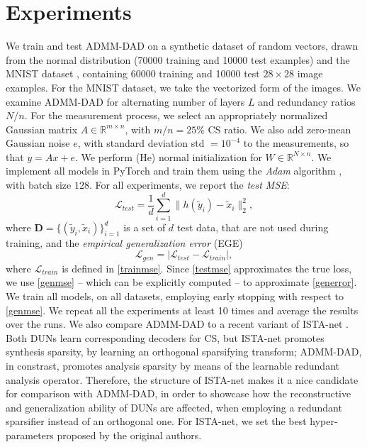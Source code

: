 \documentclass[preprint,12pt]{elsarticle}
\newcommand{\Rmn}{\mathbb{R}^{m\times n}}
\newcommand{\RNn}{\mathbb{R}^{N\times n}}
\begin{document}
\section{Experiments}
\label{exp}
We train and test ADMM-DAD on a synthetic dataset of random vectors, drawn from the normal distribution (70000 training and 10000 test examples) and the MNIST dataset \cite{mnist}, containing 60000 training and 10000 test $28\times28$ image examples. For the MNIST dataset, we take the vectorized form of the images. We examine ADMM-DAD for alternating number of layers $L$ and redundancy ratios $N/n$. For the measurement process, we select an appropriately normalized Gaussian matrix $A\in\Rmn$, with $m/n=25\%$ CS ratio. We also add zero-mean Gaussian noise $e$, with standard deviation std $=10^{-4}$ to the measurements, so that $y=Ax+e$. We perform (He) normal initialization \cite{he} for $W\in\RNn$. We implement all models in PyTorch \cite{pytorch} and train them using the \emph{Adam} algorithm \cite{adam}, with batch size $128$. For all experiments, we report the \emph{test MSE}:
\begin{equation}\label{testmse}
    \mathcal{L}_{test}=\frac{1}{d}\sum_{i=1}^d\|h(\tilde{y}_i)-\tilde{x}_i\|_2^2,
\end{equation}
where $\mathbf{D}=\{(\tilde{y}_i,\tilde{x}_i)\}_{i=1}^d$ 
is a set of $d$ test data, that are not used during training, and the \emph{empirical generalization error} (EGE)
\begin{equation}\label{genmse}
    \mathcal{L}_{gen}=|\mathcal{L}_{test}-\mathcal{L}_{train}|,
\end{equation}
where $\mathcal{L}_{train}$ is defined in \eqref{trainmse}. Since \eqref{testmse} approximates the true loss, we use \eqref{genmse} -- which can be explicitly computed -- to approximate \eqref{generror}. We train all models, on all datasets, employing early stopping \cite{earlystop} with respect to \eqref{genmse}. We repeat all the experiments at least 10 times and average the results over the runs. We also compare ADMM-DAD to a recent variant of ISTA-net \cite{istagen}. Both DUNs learn corresponding decoders for CS, but ISTA-net promotes synthesis sparsity, by learning an orthogonal sparsifying transform; ADMM-DAD, in constrast, promotes analysis sparsity by means of the learnable redundant analysis operator. Therefore, the structure of ISTA-net makes it a nice candidate for comparison with ADMM-DAD, in order to showcase how the reconstructive and generalization ability of DUNs are affected, when employing a redundant sparsifier instead of an orthogonal one. For ISTA-net, we set the best hyper-parameters proposed by the original authors.
\end{document}

